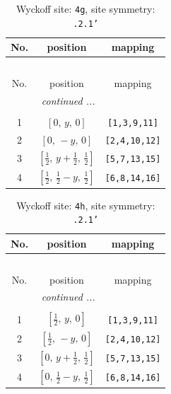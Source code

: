\documentclass[fleqn,8pt]{jsarticle}
\begin{document}
\renewcommand{\arraystretch}{1.2}
\begin{longtable}{ccc}
\caption{Wyckoff site: {\tt 4g}, site symmetry: {\tt .2.1'}}
 \\
 \hline \hline
No. & position & mapping \\ \hline \endfirsthead

\multicolumn{2}{l}{\tablename\ \thetable{}} \\
 \hline \hline
No. & position & mapping \\ \hline \endhead

 \hline \hline
\multicolumn{2}{r}{\footnotesize\it continued ...} \\ \endfoot

 \hline \hline
\multicolumn{2}{r}{} \\ \endlastfoot

1 & $\left[ 0,\, y,\, 0 \right]$ & {\tt [1,3,9,11]} \\ \hline
2 & $\left[ 0,\, - y,\, 0 \right]$ & {\tt [2,4,10,12]} \\ \hline
3 & $\left[ \frac{1}{2},\, y + \frac{1}{2},\, \frac{1}{2} \right]$ & {\tt [5,7,13,15]} \\ \hline
4 & $\left[ \frac{1}{2},\, \frac{1}{2} - y,\, \frac{1}{2} \right]$ & {\tt [6,8,14,16]} \\
\end{longtable}
\renewcommand{\arraystretch}{1.2}
\begin{longtable}{ccc}
\caption{Wyckoff site: {\tt 4h}, site symmetry: {\tt .2.1'}}
 \\
 \hline \hline
No. & position & mapping \\ \hline \endfirsthead

\multicolumn{2}{l}{\tablename\ \thetable{}} \\
 \hline \hline
No. & position & mapping \\ \hline \endhead

 \hline \hline
\multicolumn{2}{r}{\footnotesize\it continued ...} \\ \endfoot

 \hline \hline
\multicolumn{2}{r}{} \\ \endlastfoot

1 & $\left[ \frac{1}{2},\, y,\, 0 \right]$ & {\tt [1,3,9,11]} \\ \hline
2 & $\left[ \frac{1}{2},\, - y,\, 0 \right]$ & {\tt [2,4,10,12]} \\ \hline
3 & $\left[ 0,\, y + \frac{1}{2},\, \frac{1}{2} \right]$ & {\tt [5,7,13,15]} \\ \hline
4 & $\left[ 0,\, \frac{1}{2} - y,\, \frac{1}{2} \right]$ & {\tt [6,8,14,16]} \\
\end{longtable}
\end{document}
